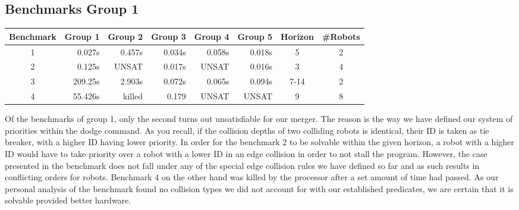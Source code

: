 \documentclass{llncs}
\begin{document}
\subsection{ Benchmarks Group 1}
\begin{table}[]
\begin{tabular}{|c|r|r|r|r|r|c|c|}
\hline
\multicolumn{1}{|l|}{Benchmark} & \multicolumn{1}{l|}{Group 1} & \multicolumn{1}{l|}{Group 2} & \multicolumn{1}{l|}{Group 3} & \multicolumn{1}{l|}{Group 4} & \multicolumn{1}{l|}{Group 5} & Horizon & \multicolumn{1}{l|}{\#Robots} \\ \hline
1                               & 0.027s                  & 0.457s                  & 0.034s                  & 0.058s                  & 0.018s                  & 5       & 2                             \\ \hline
2                               & 0.125s                   & UNSAT                   & 0.017s                  & UNSAT                   & 0.016s                  & 3       & 4                             \\ \hline
3                               & 209.25s                 & 2.903s                  & 0.072s                  & 0.065s                  & 0.094s                  & 7-14    & 2                             \\ \hline
4                               & 55.426s                 & killed                  & 0.179                   & UNSAT                   & UNSAT                   & 9       & 8                             \\ \hline
\end{tabular}
\end{table}
Of the benchmarks of group 1, only the second turns out unsatisfiable for our merger. The reason is the way we have defined our system of priorities within the dodge command. As you recall, if the collision depths of two colliding robots is identical, their ID is taken as tie breaker, with a higher ID having lower priority. In order for the benchmark 2 to be solvable within the given horizon, a robot with a higher ID would have to take priority over a robot with a lower ID in an edge collision in order to not stall the program. However, the case presented in the benchmark does not fall under any of the special edge collision rules we have defined so far and as such results in conflicting orders for robots.\newline
Benchmark 4 on the other hand was killed by the processor after a set amount of time had passed. As our personal analysis of the benchmark found no collision types we did not account for with our established predicates, we are certain that it is solvable provided better hardware.
\end{document}
